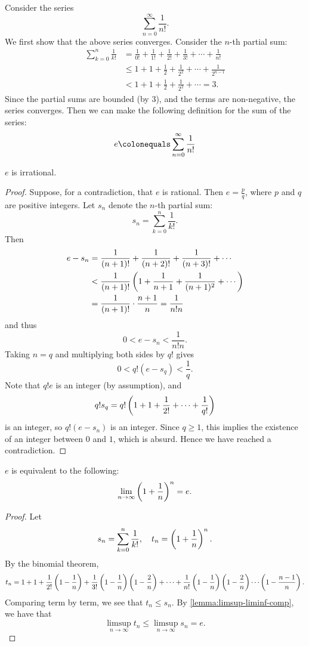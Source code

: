 \begin{example}
Consider the series
\[\sum_{n=0}^{\infty}\frac{1}{n!}.\]
We first show that the above series converges. 
Consider the $n$-th partial sum:
\begin{align*}
\sum_{k=0}^{n}\frac{1}{k!}
&=\frac{1}{0!}+\frac{1}{1!}+\frac{1}{2!}+\frac{1}{3!}+\cdots+\frac{1}{n!}\\
&\le1+1+\frac{1}{2}+\frac{1}{2^2}+\cdots+\frac{1}{2^{n-1}}\\
&<1+1+\frac{1}{2}+\frac{1}{2^2}+\cdots=3.
\end{align*}
Since the partial sums are bounded (by $3$), and the terms are non-negative, the series converges. Then we can make the following definition for the sum of the series:
\[e\colonequals\sum_{n=0}^\infty\frac{1}{n!}\]

\begin{proposition*}
$e$ is irrational.
\end{proposition*}

\begin{proof}
Suppose, for a contradiction, that $e$ is rational. Then $e=\frac{p}{q}$, where $p$ and $q$ are positive integers. Let $s_n$ denote the $n$-th partial sum:
\[s_n=\sum_{k=0}^{n}\frac{1}{k!}.\]
Then
\begin{align*}
e-s_n
&=\frac{1}{(n+1)!}+\frac{1}{(n+2)!}+\frac{1}{(n+3)!}+\cdots\\
&<\frac{1}{(n+1)!}\left(1+\frac{1}{n+1}+\frac{1}{(n+1)^2}+\cdots\right)\\
&=\frac{1}{(n+1)!}\cdot\frac{n+1}{n}=\frac{1}{n!n}
\end{align*}
and thus
\[0<e-s_n<\frac{1}{n!n}.\]
Taking $n=q$ and multiplying both sides by $q!$ gives
\[0<q!(e-s_q)<\frac{1}{q}.\]
Note that $q!e$ is an integer (by assumption), and
\[q!s_q=q!\left(1+1+\frac{1}{2!}+\cdots+\frac{1}{q!}\right)\]
is an integer, so $q!(e-s_n)$ is an integer. Since $q\ge1$, this implies the existence of an integer between $0$ and $1$, which is absurd. Hence we have reached a contradiction.
\end{proof}

\begin{lemma*}
$e$ is equivalent to the following:
\[\lim_{n\to\infty}\left(1+\frac{1}{n}\right)^n=e.\]
\end{lemma*}

\begin{proof}
Let
\[s_n=\sum_{k=0}^n\frac{1}{k!},\quad t_n=\left(1+\frac{1}{n}\right)^n.\]
By the binomial theorem,
\[t_n=1+1+\frac{1}{2!}\left(1-\frac{1}{n}\right)+\frac{1}{3!}\left(1-\frac{1}{n}\right)\left(1-\frac{2}{n}\right)+\cdots+\frac{1}{n!}\left(1-\frac{1}{n}\right)\left(1-\frac{2}{n}\right)\cdots\left(1-\frac{n-1}{n}\right).\]
Comparing term by term, we see that $t_n\le s_n$. By \ref{lemma:limsup-liminf-comp}, we have that
\[\limsup_{n\to\infty}t_n\le\limsup_{n\to\infty}s_n=e.\]


\end{proof}
\end{example}
